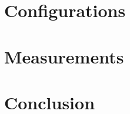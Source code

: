 \documentclass[
oneside    %
]{USN-BSc}
\begin{document}
%

%

%

%

%

\chapter{Configurations}
\label{ch:Method}


\chapter{Measurements}
\label{ch:Measurements}


\chapter{Conclusion}
\label{ch:conclusion}




\end{document}
